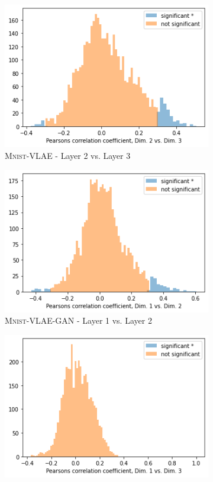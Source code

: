 \documentclass{beamer}
\begin{document}
\begin{frame}
\begin{figure}
\begin{subfigure}{.3\textwidth}
\includegraphics[width=\textwidth]{images/notprop/dsprites/vlae/dim_2_3.png}
\caption{\textsc{Mnist}-VLAE - Layer 2 vs. Layer 3}
\end{subfigure}
\begin{subfigure}{.3\textwidth}
\includegraphics[width=\textwidth]{images/notprop/dsprites/vlae_gan/dim_1_2.png}
\caption{\textsc{Mnist}-VLAE-GAN - Layer 1 vs. Layer 2}
\end{subfigure}
\hfill
\begin{subfigure}{.3\textwidth}
\includegraphics[width=\textwidth]{images/notprop/dsprites/vlae_gan/dim_1_3.png}

\end{subfigure}
\end{figure}
\end{frame}
\end{document}
